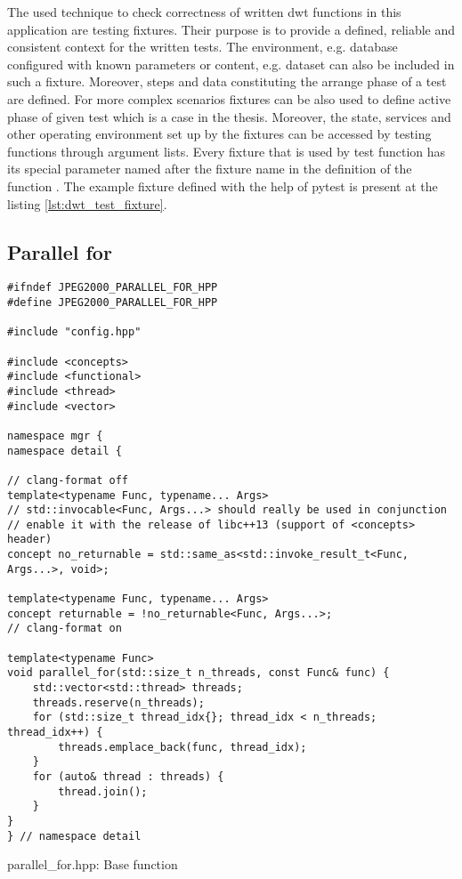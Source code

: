 The used technique to check correctness of written dwt functions in this application are testing
fixtures. Their purpose is to provide a defined, reliable and consistent context for the written tests.
The environment, e.g. database configured with known parameters or content, e.g. dataset can also
be included in such a fixture. Moreover, steps and data constituting the arrange phase of a test
are defined. For more complex scenarios fixtures can be also used to define active phase 
of given test which is a case in the thesis. Moreover, the state, services and other operating
environment set up by the fixtures can be accessed by testing functions through argument lists.
Every fixture that is used by test function has its special parameter named after the fixture name
in the definition of the function \cite{pytest}. The example fixture defined with the help
of pytest is present at the listing \ref{lst:dwt_test_fixture}.

\subsection{Parallel for} \label{sec:parallel_for}

\begin{listing}[htb]
\begin{verbatim}
#ifndef JPEG2000_PARALLEL_FOR_HPP
#define JPEG2000_PARALLEL_FOR_HPP

#include "config.hpp"

#include <concepts>
#include <functional>
#include <thread>
#include <vector>

namespace mgr {
namespace detail {

// clang-format off
template<typename Func, typename... Args>
// std::invocable<Func, Args...> should really be used in conjunction
// enable it with the release of libc++13 (support of <concepts> header)
concept no_returnable = std::same_as<std::invoke_result_t<Func, Args...>, void>;

template<typename Func, typename... Args>
concept returnable = !no_returnable<Func, Args...>;
// clang-format on

template<typename Func>
void parallel_for(std::size_t n_threads, const Func& func) {
    std::vector<std::thread> threads;
    threads.reserve(n_threads);
    for (std::size_t thread_idx{}; thread_idx < n_threads; thread_idx++) {
        threads.emplace_back(func, thread_idx);
    }
    for (auto& thread : threads) {
        thread.join();
    }
}
} // namespace detail
\end{verbatim}
\caption{parallel\_for.hpp: Base function}
\label{lst:parallel_for_base_function}
\end{listing}

